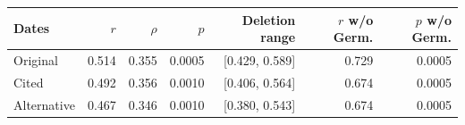 \begin{tabular}{lrrrrrr}
\toprule
Dates & $r$ & $\rho$ & $p$ & Deletion range & $r$ w/o Germ. & $p$ w/o Germ. \\
\midrule
Original & 0.514 & 0.355 & 0.0005 & [0.429, 0.589] & 0.729 & 0.0005 \\
Cited & 0.492 & 0.356 & 0.0010 & [0.406, 0.564] & 0.674 & 0.0005 \\
Alternative & 0.467 & 0.346 & 0.0010 & [0.380, 0.543] & 0.674 & 0.0005 \\
\bottomrule
\end{tabular}
